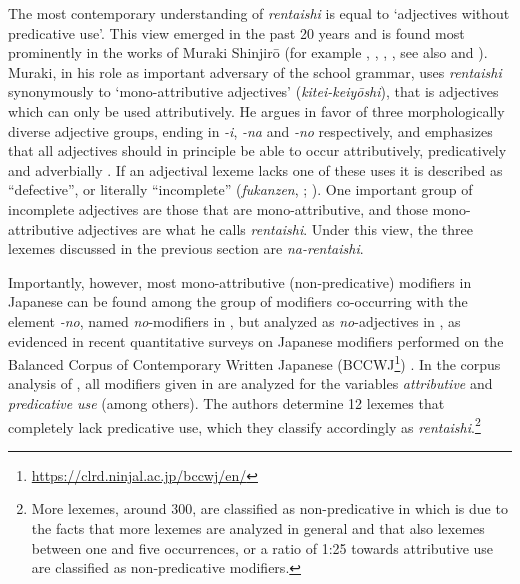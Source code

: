\documentclass[output=paper,colorlinks,citecolor=brown]{langscibook}
\begin{document}
The most contemporary understanding of \emph{rentaishi} is equal to `adjectives without predicative use'. This view emerged in the past 20 years and is found most prominently in the works of Muraki Shinjirō (for example \citeyear{muraki1996}, \citeyear{muraki2009}, \citeyear{muraki2012}, \citeyear{muraki2015}, see also \citealt{oshimaakitasano2019} and \citealt{oshimahayashi2021-nihongo, oshimahayashi2021-redefining}). Muraki, in his role as important adversary of the school grammar, uses \emph{rentaishi} synonymously to `mono-attributive adjectives' (\emph{kitei-keiyōshi}), that is adjectives which can only be used attributively. He argues in favor of three morphologically diverse adjective groups, ending in \emph{-i}, \emph{-na} and \emph{-no} respectively, and emphasizes that all adjectives should in principle be able to occur attributively, predicatively and adverbially \citet[36--38]{muraki2012}. If an adjectival lexeme lacks one of these uses it is described as ``defective'', or literally ``incomplete'' (\emph{fukanzen}, \citealt[37]{muraki2012}; \citealt[26]{muraki2015}). One important group of incomplete adjectives are those that are mono-attributive, and those mono-attributive adjectives are what he calls \emph{rentaishi}. Under this view, the three lexemes discussed in the previous section are \emph{na-rentaishi}.

Importantly, however, most mono-attributive (non-predicative) modifiers in Japanese can be found among the group of modifiers co-occurring with the element \emph{-no}, named \emph{no}-modifiers in \citet{kohlich2023}, but analyzed as \emph{no}-adjectives in \citet{muraki2012}, as evidenced in recent quantitative surveys on Japanese modifiers performed on the Balanced Corpus of Contemporary Written Japanese (BCCWJ\footnote{\url{https://clrd.ninjal.ac.jp/bccwj/en/}}) \citep{abekitazawaliu2022, kohlich2023}. In the corpus analysis of \citet{abekitazawaliu2022}, all modifiers given in \citet{muraki2012} are analyzed for the variables \emph{attributive} and \emph{predicative} \emph{use} (among others). The authors determine 12 lexemes that completely lack predicative use, which they classify accordingly as \emph{rentaishi}.\footnote{More lexemes, around 300, are classified as non-predicative in \citet{kohlich2023} which is due to the facts that more lexemes are analyzed in general and that also lexemes between one and five occurrences, or a ratio of 1:25 towards attributive use are classified as non-predicative modifiers.}
\end{document}
